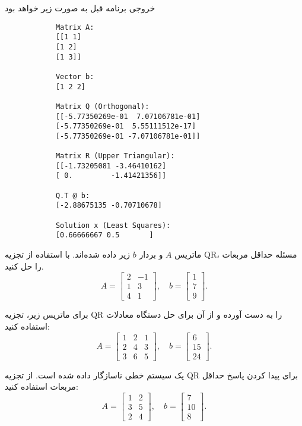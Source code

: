 خروجی برنامه قبل به صورت زیر خواهد بود
\begin{code}
	\begin{latin}
		\begin{lstlisting}
			Matrix A:
			[[1 1]
			[1 2]
			[1 3]]
			
			Vector b:
			[1 2 2]
			
			Matrix Q (Orthogonal):
			[[-5.77350269e-01  7.07106781e-01]
			[-5.77350269e-01  5.55111512e-17]
			[-5.77350269e-01 -7.07106781e-01]]
			
			Matrix R (Upper Triangular):
			[[-1.73205081 -3.46410162]
			[ 0.         -1.41421356]]
			
			Q.T @ b:
			[-2.88675135 -0.70710678]
			
			Solution x (Least Squares):
			[0.66666667 0.5       ]
		\end{lstlisting}
	\end{latin}
\end{code}
\begin{exercise}
	ماتریس \(A\) و بردار \(b\) زیر داده شده‌اند. با استفاده از تجزیه QR، مسئله حداقل مربعات را حل کنید.
	\[
	A = \begin{bmatrix}
		2 & -1 \\
		1 & 3 \\
		4 & 1
	\end{bmatrix}, \quad
	b = \begin{bmatrix}
		1 \\
		7 \\
		9
	\end{bmatrix}.
	\]
\end{exercise}
\begin{exercise}
	برای ماتریس زیر، تجزیه QR را به دست آورده و از آن برای حل دستگاه معادلات استفاده کنید:
	\[
	A = \begin{bmatrix}
		1 & 2 & 1 \\
		2 & 4 & 3 \\
		3 & 6 & 5
	\end{bmatrix}, \quad
	b = \begin{bmatrix}
		6 \\
		15 \\
		24
	\end{bmatrix}.
	\]
\end{exercise}
\begin{exercise}
	یک سیستم خطی ناسازگار داده شده است. از تجزیه QR برای پیدا کردن پاسخ حداقل مربعات استفاده کنید:
	\[
	A = \begin{bmatrix}
		1 & 2 \\
		3 & 5 \\
		2 & 4
	\end{bmatrix}, \quad
	b = \begin{bmatrix}
		7 \\
		10 \\
		8
	\end{bmatrix}.
	\]
\end{exercise}
